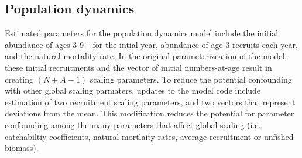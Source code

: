 \documentclass[12pt,letterpaper]{article}
\begin{document}
  \subsection{Population dynamics} %
  \label{sub:population_dynamics}
  Estimated parameters for the population dynamics model include the initial abundance of ages 3-9+ for the intial year, abundance of age-3 recruits each year, and the natural mortality rate. In the original parameterizeation of the model, these initial recruitments and the vector of initial numbers-at-age result in creating $(N + A-1)$ scaling parameters.  To reduce the potential confounding with other global scaling parmaters, updates to the model code include estimation of two recruitment scaling parameters, and two vectors that represent deviations from the mean. This modification reduces the potential for parameter confounding among the many parameters that affect global scaling (i.e., catchabiltiy coefficients, natural mortlaity rates, average recruitment or unfished biomass).

    
  

  
\end{document}

